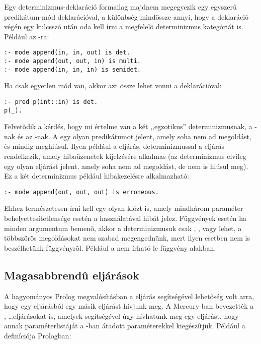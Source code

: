 Egy determinizmus-deklaráció formailag majdnem megegyezik egy egyszerû predikátum-mód
deklarációval, a különbség mindössze annyi, hogy a deklaráció végén egy  kulcsszó
után oda kell írni a megfelelõ determinizmus kategóriát is. Például az -ra:

\begin{verbatim}
:- mode append(in, in, out) is det.
:- mode append(out, out, in) is multi.
:- mode append(in, in, in) is semidet.
\end{verbatim}

Ha csak egyetlen mód van, akkor azt össze lehet vonni a  deklarációval:

\begin{verbatim}
:- pred p(int::in) is det.
p(_).
\end{verbatim}

Felvetõdik a kérdés, hogy mi értelme van a két ,,egzotikus'' determinizmusnak, a
-nak és az -nak. A  egy olyan predikátumot
jelent, amely soha nem ad megoldást, és mindig meghiúsul. Ilyen például a 
eljárás.  determinizmussal a  eljárás rendelkezik,
amely hibaüzenetek kijelzésére alkalmas (az  determinizmus elvileg egy
olyan eljárást jelent, amely soha nem ad megoldást, de nem is hiúsul meg). Ez a két
determinizmus például hibakezelésre alkalmazható:

\begin{verbatim}
:- mode append(out, out, out) is erroneous.
\end{verbatim}

Ehhez természetesen írni kell egy olyan klózt is, amely mindhárom paraméter
behelyettesítetlensége esetén a  használatával hibát jelez.
\br
Függvények esetén ha minden argumentum bemenõ, akkor a determinizmusuk csak
, ,  vagy  lehet, a többszörös
megoldásokat nem szabad megengednünk, mert ilyen esetben nem is beszélhetünk
függvényrõl. Például a  nem írható le függvény alakban.


\subsection{Magasabbrendû eljárások}

A hagyományos Prolog megvalósításban a  eljárás segítségével lehetõség
volt arra, hogy egy eljárásból egy másik eljárást hívjunk meg. A Mercury-ban
bevezették a ,  \ldots eljárásokat is, amelyek segítségével
úgy hívhatunk meg egy eljárást, hogy annak paraméterlistáját a -ban
átadott paraméterekkel kiegészítjük. Például a  definíciója Prologban:

